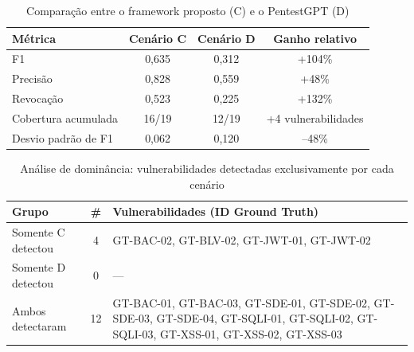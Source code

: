 \begin{table}[htbp]
\centering
\caption{Comparação entre o framework proposto (C) e o PentestGPT (D)}
\label{tab:comparativo-c-vs-d}
\begin{tabular}{lccc}
\toprule
\textbf{Métrica} & \textbf{Cenário C} & \textbf{Cenário D} & \textbf{Ganho relativo} \\
\midrule
F1 & 0,635 & 0,312 & +104\% \\
Precisão & 0,828 & 0,559 & +48\% \\
Revocação & 0,523 & 0,225 & +132\% \\
Cobertura acumulada & 16/19 & 12/19 & +4 vulnerabilidades \\
Desvio padrão de F1 & 0,062 & 0,120 & --48\% \\
\bottomrule
\end{tabular}
\end{table}

\begin{table}[htbp]
\centering
\caption{Análise de dominância: vulnerabilidades detectadas exclusivamente por cada cenário}
\label{tab:dominancia}
\begin{tabular}{lcp{7cm}}
\toprule
\textbf{Grupo} & \textbf{\#} & \textbf{Vulnerabilidades (ID Ground Truth)} \\
\midrule
Somente C detectou & 4 & GT-BAC-02, GT-BLV-02, GT-JWT-01, GT-JWT-02 \\
Somente D detectou & 0 & --- \\
Ambos detectaram & 12 & GT-BAC-01, GT-BAC-03, GT-SDE-01, GT-SDE-02, GT-SDE-03, GT-SDE-04, GT-SQLI-01, GT-SQLI-02, GT-SQLI-03, GT-XSS-01, GT-XSS-02, GT-XSS-03 \\
\bottomrule
\end{tabular}
\end{table}
